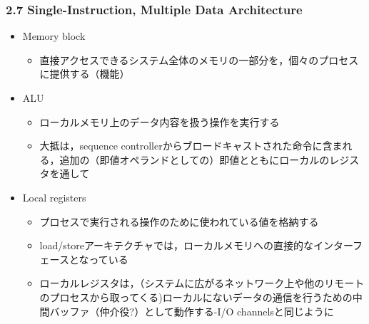 \documentclass[12pt, unicode, dvipdfmx, t]{beamer}
\begin{document}
\begin{frame}[t]
	\frametitle{2.7 Single-Instruction, Multiple Data Architecture}
	\begin{itemize}
		\item Memory block
		\begin{itemize}
			\item 直接アクセスできるシステム全体のメモリの一部分を，個々のプロセスに提供する（機能）
		\end{itemize}

		\item ALU
		\begin{itemize}
			\item ローカルメモリ上のデータ内容を扱う操作を実行する
			\item 大抵は，sequence controllerからブロードキャストされた命令に含まれる，追加の（即値オペランドとしての）即値とともにローカルのレジスタを通して
		\end{itemize}
		
	\item Local registers
		\begin{itemize}
			\item プロセスで実行される操作のために使われている値を格納する
			\item load/storeアーキテクチャでは，ローカルメモリへの直接的なインターフェースとなっている
			\item ローカルレジスタは，（システムに広がるネットワーク上や他のリモートのプロセスから取ってくる)ローカルにないデータの通信を行うための中間バッファ（仲介役?）として動作する-I/O channelsと同じように
		\end{itemize}
	\end{itemize}
\end{frame}
\end{document}
